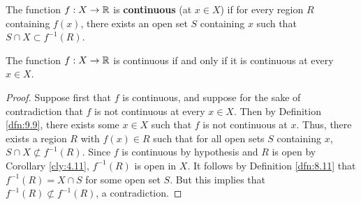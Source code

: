 \documentclass[../main.tex]{subfiles}
\begin{document}
\begin{definition}\label{dfn:9.9}
    The function $f:X\to\mathbb{R}$ is \textbf{continuous} (at $x\in X$) if for every region $R$ containing $f(x)$, there exists an open set $S$ containing $x$ such that $S\cap X\subset f^{-1}(R)$.
\end{definition}

\begin{theorem}\label{trm:9.10}
    The function $f:X\to\mathbb{R}$ is continuous if and only if it is continuous at every $x\in X$.
    \begin{proof}
        Suppose first that $f$ is continuous, and suppose for the sake of contradiction that $f$ is not continuous at every $x\in X$. Then by Definition \ref{dfn:9.9}, there exists some $x\in X$ such that $f$ is not continuous at $x$. Thus, there exists a region $R$ with $f(x)\in R$ such that for all open sets $S$ containing $x$, $S\cap X\not\subset f^{-1}(R)$. Since $f$ is continuous by hypothesis and $R$ is open by Corollary \ref{cly:4.11}, $f^{-1}(R)$ is open in $X$. It follows by Definition \ref{dfn:8.11} that $f^{-1}(R)=X\cap S$ for some open set $S$. But this implies that $f^{-1}(R)\not\subset f^{-1}(R)$, a contradiction.\par

\end{proof}
\end{theorem}
\end{document}
